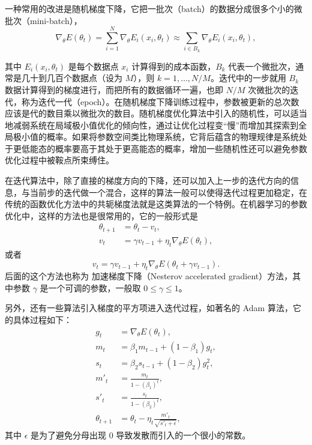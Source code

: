 一种常用的改进是随机梯度下降，它把一批次（batch）的数据分成很多个小的微批次（mini-batch），
\begin{equation}
\nabla_\theta E(\theta_t)=\sum_{i=1}^{N}\nabla_\theta E_i(x_i,\theta_t)\approx\sum_{i\in B_k}\nabla_\theta E_i(x_i,\theta_t),
\tag{8.1.21}
\end{equation}

其中 $E_i(x_i,\theta_t)$ 是每个数据点 $x_i$ 计算得到的成本函数，$B_k$ 代表一个微批次，通常是几十到几百个数据点（设为 $M$），则 $k=1,\ldots,N/M$。迭代中的一步就用 $B_k$ 数据计算得到的梯度进行，而把所有的数据循环一遍，也即 $N/M$ 次微批次的迭代，称为迭代一代（epoch）。在随机梯度下降训练过程中，参数被更新的总次数应该是代的数目乘以微批次的数目。随机梯度优化算法中引入的随机性，可以适当地减弱系统在局域极小值优化的倾向性，通过让优化过程变“慢”而增加其探索到全局极小值的概率。如果将参数空间类比物理系统，它背后蕴含的物理规律是系统处于更低能态的概率要高于其处于更高能态的概率，增加一些随机性还可以避免参数优化过程中被鞍点所束缚住。

在迭代算法中，除了直接的梯度方向的下降，还可以加入上一步的迭代方向的信息，与当前步的迭代做一个混合，这样的算法一般可以使得迭代过程更加稳定，在传统的函数优化方法中的共轭梯度法就是这类算法的一个特例。在机器学习的参数优化中，这样的方法也是很常用的，它的一般形式是
\begin{equation}
\begin{aligned}
\theta_{t+1}&=\theta_t-v_t,\\
v_t&=\gamma v_{t-1}+\eta_t\nabla_\theta E(\theta_t),
\end{aligned}
\tag{8.1.22}
\end{equation}
或者
\begin{equation}
v_t=\gamma v_{t-1}+\eta_t\nabla_\theta E(\theta_t+\gamma v_{t-1}).
\tag{8.1.23}
\end{equation}
后面的这个方法也称为  加速梯度下降（Nesterov accelerated gradient）方法，其中参数 $\gamma$ 是一个可调的参数，一般取 $0\le\gamma\le1$。

另外，还有一些算法引入梯度的平方项进入迭代过程，如著名的 Adam 算法，它的具体过程如下：
\begin{equation}
\begin{aligned}
g_t&=\nabla_\theta E(\theta_t),\\
m_t&=\beta_1m_{t-1}+(1-\beta_1)g_t,\\
s_t&=\beta_2s_{t-1}+(1-\beta_2)g_t^2,\\
m'_t&=\frac{m_t}{1-(\beta_1)^t},\\
s'_t&=\frac{s_t}{1-(\beta_2)^t},\\
\theta_{t+1}&=\theta_t-\eta_t\frac{m'_t}{\sqrt{s'_t+\epsilon}},
\end{aligned}
\tag{8.1.24}
\end{equation}
其中 $\epsilon$ 是为了避免分母出现 0 导致发散而引入的一个很小的常数。

